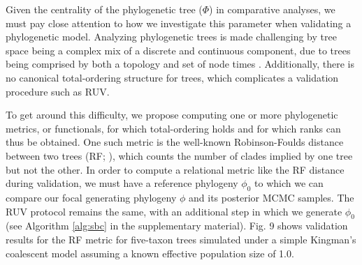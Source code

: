 \documentclass[oneside]{article}
\begin{document}
\begin{tcolorbox}[breakable, width=\textwidth, colback=gray!10, boxrule=0pt, title=Box 2: Validating a phylogenetic model with respect to its phylogenetic tree parameter, fonttitle=\bfseries]
  \small 

  Given the centrality of the phylogenetic tree ($\Phi$) in comparative analyses, we must pay close attention to how we investigate this parameter when validating a phylogenetic model.
  Analyzing phylogenetic trees is made challenging by tree space being a complex mix of a discrete and continuous component, due to trees being comprised by both a topology and set of node times \citep{semple03,gavryushkin16}.
  Additionally, there is no canonical total-ordering  structure for trees, which complicates a validation procedure such as RUV.

  \vspace{.25cm}

  To get around this difficulty, we propose computing one or more phylogenetic metrics, or functionals, for which total-ordering holds and for which ranks can thus be obtained.
  One such metric is the well-known Robinson-Foulds distance between two trees (RF; \citealp{Robinson1981}), which counts the number of clades implied by one tree but not the other.
  In order to compute a relational metric like the RF distance during validation, we must have a reference phylogeny $\phi_0$ to which we can compare our focal generating phylogeny $\phi$ and its posterior MCMC samples.
  The RUV protocol remains the same, with an additional step in which we generate $\phi_0$ (see Algorithm \ref{alg:sbc} in the supplementary material).
  Fig. 9 shows validation results for the RF metric for five-taxon trees simulated under a simple Kingman's coalescent model assuming a known effective population size of 1.0.


\end{tcolorbox}
\end{document}
